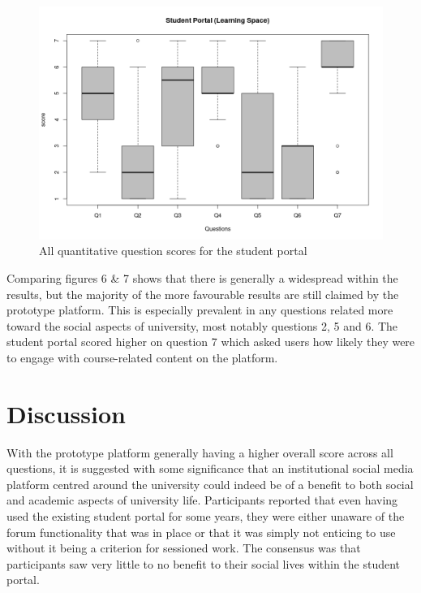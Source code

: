 \documentclass[lettersize,journal]{IEEEtran}
\begin{document}
		\begin{figure}[h!]
        		\includegraphics[width=\linewidth]{images/StudentPortalFull.png}
        		\caption{All quantitative question scores for the student portal}
        		\label{figure 6}
		\end{figure}

		Comparing figures 6 \& 7 shows that there is generally a widespread within the results, but the majority of the more favourable results are still claimed by the prototype platform.
		This is especially prevalent in any questions related more toward the social aspects of university, most notably questions 2, 5 and 6. The student portal scored higher on question 7
		which asked users how likely they were to engage with course-related content on the platform.


\section{Discussion}

With the prototype platform generally having a higher overall score across all questions, it is suggested with some significance that an institutional social media platform centred around the university
could indeed be of a benefit to both social and academic aspects of university life. Participants reported that even having used the existing student portal for some years, they were either unaware of the
forum functionality that was in place or that it was simply not enticing to use without it being a criterion for sessioned work. The consensus was that participants saw very little to no benefit
to their social lives within the student portal.
\end{document}
